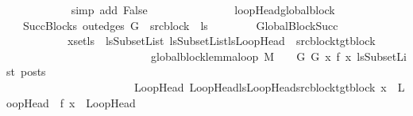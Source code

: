 \begin{isabellebody}
\ \ \ \ \ \ \ \ \ \ \isamarkupfalse%
\ {\isacharparenleft}{\kern0pt}simp\ add{\isacharcolon}{\kern0pt}\ False{\isacharparenright}{\kern0pt}\isanewline
\ \ \ \ \ \ \isamarkupfalse%
\isanewline
\ \ \ \ \isamarkupfalse%
\isanewline
\ \ \isamarkupfalse%
\isanewline
{}\isamarkupfalse%
%
\endisatagproof
{\isafoldproof}%
%
\isadelimproof
%
\endisadelimproof
%
\isadelimdocument
%
\endisadelimdocument
%
\isatagdocument
%
\isamarkuptrue%
%
\endisatagdocument
{\isafolddocument}%
%
\isadelimdocument
%
\endisadelimdocument
{}\isamarkupfalse%
\ loopHead{\isacharunderscore}{\kern0pt}global{\isacharunderscore}{\kern0pt}block{\isacharcolon}{\kern0pt}\isanewline
\ \ \ SuccBlocks{\isacharcolon}{\kern0pt}\ {\isachardoublequoteopen}out{\isacharunderscore}{\kern0pt}edges\ G\ {\isacharbang}{\kern0pt}\ src{\isacharunderscore}{\kern0pt}block\ {\isacharequal}{\kern0pt}\ ls{\isachardoublequoteclose}\ \isanewline
\ \ \ \ \ \ \ GlobalBlockSucc{\isacharcolon}{\kern0pt}\ \isanewline
\ \ \ \ \ \ \ \ \ \ \ {\isachardoublequoteopen}{\isasymforall}x{\isasymin}set{\isacharparenleft}{\kern0pt}ls{\isacharparenright}{\kern0pt}{\isachardot}{\kern0pt}\ {\isacharparenleft}{\kern0pt}\ {\isasymexists}lsSubsetList{\isachardot}{\kern0pt}\ lsSubsetList{\isasymsubseteq}{\isacharparenleft}{\kern0pt}lsLoopHead\ {\isasymunion}\ {\isacharbraceleft}{\kern0pt}{\isacharparenleft}{\kern0pt}src{\isacharunderscore}{\kern0pt}block{\isacharcomma}{\kern0pt}tgt{\isacharunderscore}{\kern0pt}block{\isacharparenright}{\kern0pt}{\isacharbraceright}{\kern0pt}{\isacharparenright}{\kern0pt}\ {\isasymand}\ \isanewline
\ \ \ \ \ \ \ \ \ \ \ \ \ \ \ \ \ \ \ \ \ \ \ \ \ \ global{\isacharunderscore}{\kern0pt}block{\isacharunderscore}{\kern0pt}lemma{\isacharunderscore}{\kern0pt}loop\ M\ {\isasymLambda}\ {\isasymGamma}\ {\isasymOmega}\ G\ G{\isacharprime}{\kern0pt}\ x\ {\isacharparenleft}{\kern0pt}f\ x{\isacharparenright}{\kern0pt}\ lsSubsetList\ posts\ {\isacharparenright}{\kern0pt}\ \isanewline
\ \ \ \ \ \ \ \ \ \ \ \ \ \ \ \ \ \ \ \ \ \ {\isasymor}\ {\isacharparenleft}{\kern0pt}{\isasymexists}{\isacharparenleft}{\kern0pt}LoopHead{\isacharcomma}{\kern0pt}\ LoopHead{\isacharprime}{\kern0pt}{\isacharparenright}{\kern0pt}{\isasymin}{\isacharparenleft}{\kern0pt}lsLoopHead{\isasymunion}{\isacharbraceleft}{\kern0pt}{\isacharparenleft}{\kern0pt}src{\isacharunderscore}{\kern0pt}block{\isacharcomma}{\kern0pt}tgt{\isacharunderscore}{\kern0pt}block{\isacharparenright}{\kern0pt}{\isacharbraceright}{\kern0pt}{\isacharparenright}{\kern0pt}{\isachardot}{\kern0pt}\ {\isacharparenleft}{\kern0pt}x\ {\isacharequal}{\kern0pt}\ LoopHead\ {\isasymand}\ f\ x\ {\isacharequal}{\kern0pt}\ LoopHead{\isacharprime}{\kern0pt}{\isacharparenright}{\kern0pt}{\isacharparenright}{\kern0pt}{\isachardoublequoteclose}\isanewline

\end{isabellebody}
